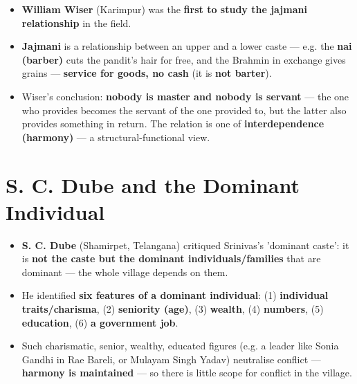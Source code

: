 \begin{KeyConcept}
\begin{itemize}
\item \textbf{William Wiser} (Karimpur) was the \textbf{first to study the jajmani relationship} in the field.
\item \textbf{Jajmani} is a relationship between an upper and a lower caste --- e.g. the \textbf{nai (barber)} cuts the pandit's hair for free, and the Brahmin in exchange gives grains --- \textbf{service for goods, no cash} (it is \textbf{not barter}).
\item Wiser's conclusion: \textbf{nobody is master and nobody is servant} --- the one who provides becomes the servant of the one provided to, but the latter also provides something in return. The relation is one of \textbf{interdependence (harmony)} --- a structural-functional view.
\end{itemize}
\end{KeyConcept}

\section{S. C. Dube and the Dominant Individual}

\begin{KeyConcept}
\begin{itemize}
\item \textbf{S. C. Dube} (Shamirpet, Telangana) critiqued Srinivas's 'dominant caste': it is \textbf{not the caste but the dominant individuals/families} that are dominant --- the whole village depends on them.
\item He identified \textbf{six features of a dominant individual}: (1) \textbf{individual traits/charisma}, (2) \textbf{seniority (age)}, (3) \textbf{wealth}, (4) \textbf{numbers}, (5) \textbf{education}, (6) \textbf{a government job}.
\item Such charismatic, senior, wealthy, educated figures (e.g. a leader like Sonia Gandhi in Rae Bareli, or Mulayam Singh Yadav) neutralise conflict --- \textbf{harmony is maintained} --- so there is little scope for conflict in the village.
\end{itemize}
\end{KeyConcept}

